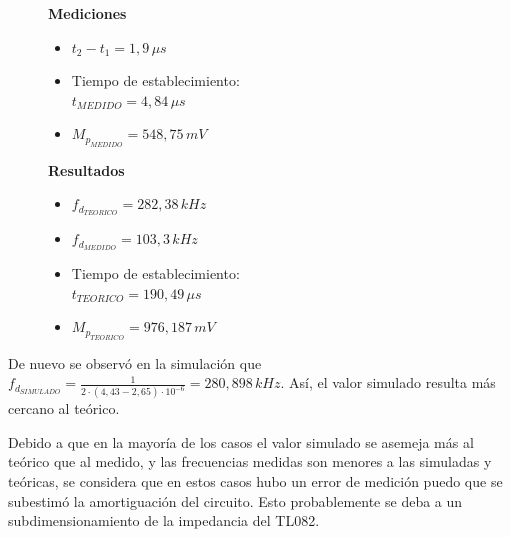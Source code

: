 \begin{figure}[H]
\centering
\begin{minipage}{0.45\textwidth}
    \textbf{Mediciones}
    \begin{itemize}
        \item $t_2 - t_1 = 1,9 \, \mu s $
        \item Tiempo de establecimiento: \\ $t_{MEDIDO} =  4,84 \,\mu s$
        \item $M_{p_{MEDIDO}} = 548,75 \,mV$
    \end{itemize}
\end{minipage}
\hfill
\begin{minipage}{0.45\textwidth}
    \textbf{Resultados}
    \begin{itemize}
        \item $f_{d_{TEORICO}} = 282,38 \,kHz$
        \item $f_{d_{MEDIDO}} = 103,3 \,kHz$
        \item Tiempo de establecimiento: \\ $t_{TEORICO} = 190,49 \,\mu s$
        \item $M_{p_{TEORICO}} = 976,187 \,mV$
    \end{itemize}
\end{minipage}
\end{figure}
De nuevo se observó en la simulación que $f_{d_{SIMULADO}}=\frac{1}{2\cdot (4,43-2,65)\cdot 10^{-6}}=280,898 \, kHz$. Así, el valor simulado resulta más cercano al teórico.

\vspace{0.1mm}
Debido a que en la mayoría de los casos el valor simulado se asemeja más al teórico que al medido, y las frecuencias medidas son menores a las simuladas y teóricas, se considera que en estos casos hubo un error de medición puedo que se subestimó la amortiguación del circuito. Esto probablemente se deba a un subdimensionamiento de la impedancia del TL082.

